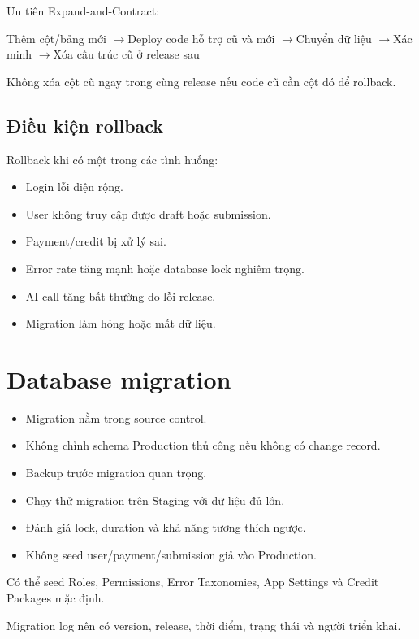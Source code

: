 \documentclass[11pt,a4paper]{article}
\newcommand{\arrow}{\ensuremath{\rightarrow}}
\begin{document}
Ưu tiên Expand-and-Contract:

\begin{flowbox}
Thêm cột/bảng mới \arrow Deploy code hỗ trợ cũ và mới \arrow Chuyển dữ liệu \arrow Xác minh \arrow Xóa cấu trúc cũ ở release sau
\end{flowbox}

Không xóa cột cũ ngay trong cùng release nếu code cũ cần cột đó để rollback.

\subsection{Điều kiện rollback}

Rollback khi có một trong các tình huống:

\begin{itemize}
  \item Login lỗi diện rộng.
  \item User không truy cập được draft hoặc submission.
  \item Payment/credit bị xử lý sai.
  \item Error rate tăng mạnh hoặc database lock nghiêm trọng.
  \item AI call tăng bất thường do lỗi release.
  \item Migration làm hỏng hoặc mất dữ liệu.
\end{itemize}

\section{Database migration}

\begin{itemize}
  \item Migration nằm trong source control.
  \item Không chỉnh schema Production thủ công nếu không có change record.
  \item Backup trước migration quan trọng.
  \item Chạy thử migration trên Staging với dữ liệu đủ lớn.
  \item Đánh giá lock, duration và khả năng tương thích ngược.
  \item Không seed user/payment/submission giả vào Production.
\end{itemize}

Có thể seed Roles, Permissions, Error Taxonomies, App Settings và Credit Packages mặc định.

Migration log nên có version, release, thời điểm, trạng thái và người triển khai.
\end{document}
